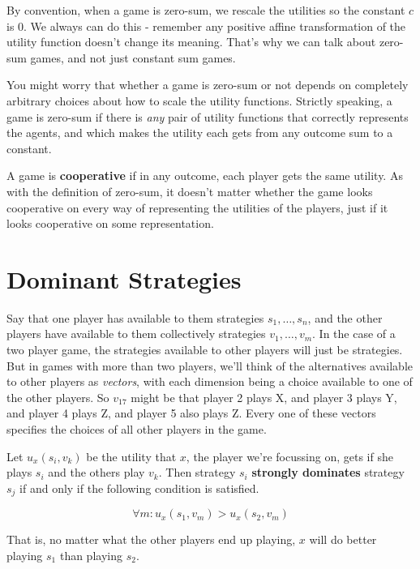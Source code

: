 \documentclass[
  11pt,
  letterpaper,
]{scrbook}
\begin{document}
By convention, when a game is zero-sum, we rescale the utilities so the
constant \(c\) is 0. We always can do this - remember any positive
affine transformation of the utility function doesn't change its
meaning. That's why we can talk about zero-sum games, and not just
constant sum games.

You might worry that whether a game is zero-sum or not depends on
completely arbitrary choices about how to scale the utility functions.
Strictly speaking, a game is zero-sum if there is \emph{any} pair of
utility functions that correctly represents the agents, and which makes
the utility each gets from any outcome sum to a constant.

A game is \textbf{cooperative} if in any outcome, each player gets the
same utility. As with the definition of zero-sum, it doesn't matter
whether the game looks cooperative on every way of representing the
utilities of the players, just if it looks cooperative on some
representation.

\section{Dominant Strategies}\label{sec-dominant-strategies}

Say that one player has available to them strategies
\(s_1, \dots, s_n\), and the other players have available to them
collectively strategies \(v_1, \dots, v_m\). In the case of a two player
game, the strategies available to other players will just be strategies.
But in games with more than two players, we'll think of the alternatives
available to other players as \emph{vectors}, with each dimension being
a choice available to one of the other players. So \(v_17\) might be
that player 2 plays X, and player 3 plays Y, and player 4 plays Z, and
player 5 also plays Z. Every one of these vectors specifies the choices
of all other players in the game.

Let \(u_x(s_i, v_k)\) be the utility that \(x\), the player we're
focussing on, gets if she plays \(s_i\) and the others play \(v_k\).
Then strategy \(s_i\) \textbf{strongly dominates} strategy \(s_j\) if
and only if the following condition is satisfied.

\begin{equation*}
\forall m: u_x(s_1, v_m) > u_x(s_2, v_m)
\end{equation*}

That is, no matter what the other players end up playing, \(x\) will do
better playing \(s_1\) than playing \(s_2\).
\end{document}
